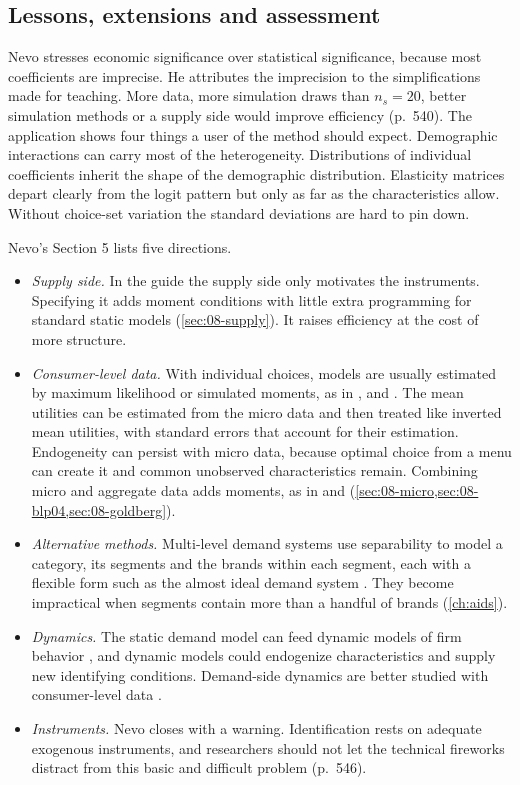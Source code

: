 \subsection{Lessons, extensions and assessment}\label{sec:08-nevo00-lessons}

Nevo stresses economic significance over statistical significance, because most coefficients are
imprecise. He attributes the imprecision to the simplifications made for teaching. More data, more
simulation draws than $n_s=20$, better simulation methods or a supply side would improve efficiency
(p.~540). The application shows four things a user of the method should expect. Demographic interactions
can carry most of the heterogeneity. Distributions of individual coefficients inherit the shape of the
demographic distribution. Elasticity matrices depart clearly from the logit pattern but only as far as
the characteristics allow. Without choice-set variation the standard deviations are hard to pin down.

Nevo's Section 5 lists five directions.
\begin{itemize}
\item \emph{Supply side.} In the guide the supply side only motivates the instruments. Specifying it
  adds moment conditions with little extra programming for standard static models (\cref{sec:08-supply}).
  It raises efficiency at the cost of more structure.
\item \emph{Consumer-level data.} With individual choices, models are usually estimated by maximum
  likelihood or simulated moments, as in \citet{Goldberg1995}, \citet{RossiMcCullochAllenby1996} and
  \citet{McFaddenTrain2000}. The mean utilities can be estimated from the micro data and then treated like
  inverted mean utilities, with standard errors that account for their estimation. Endogeneity can
  persist with micro data, because optimal choice from a menu can create it \citep{Kennan1989} and common
  unobserved characteristics remain. Combining micro and aggregate data adds moments, as in
  \citet{Petrin2002} and \citet{BerryLevinsohnPakes2004} (\cref{sec:08-micro,sec:08-blp04,sec:08-goldberg}).
\item \emph{Alternative methods.} Multi-level demand systems use separability to model a category, its
  segments and the brands within each segment, each with a flexible form such as the almost ideal demand
  system \citep{DeatonMuellbauer1980a,HausmanLeonardZona1994}. They become impractical when segments
  contain more than a handful of brands (\cref{ch:aids}).
\item \emph{Dynamics.} The static demand model can feed dynamic models of firm behavior
  \citep{PakesMcGuire1994}, and dynamic models could endogenize characteristics and supply new
  identifying conditions. Demand-side dynamics are better studied with consumer-level data
  \citep{ErdemKeane1996}.
\item \emph{Instruments.} Nevo closes with a warning. Identification rests on adequate exogenous
  instruments, and researchers should not let the technical fireworks distract from this basic and
  difficult problem (p.~546).
\end{itemize}

